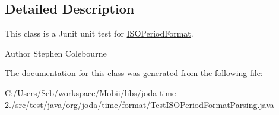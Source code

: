 \subsection{Detailed Description}
This class is a Junit unit test for \hyperlink{classorg_1_1joda_1_1time_1_1format_1_1_i_s_o_period_format}{I\-S\-O\-Period\-Format}.

\begin{DoxyAuthor}{Author}
Stephen Colebourne 
\end{DoxyAuthor}


The documentation for this class was generated from the following file\-:\begin{DoxyCompactItemize}
\item 
C\-:/\-Users/\-Seb/workspace/\-Mobii/libs/joda-\/time-\/2./src/test/java/org/joda/time/format/Test\-I\-S\-O\-Period\-Format\-Parsing.\-java\end{DoxyCompactItemize}
